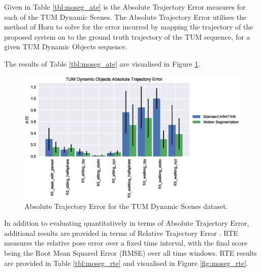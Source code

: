 Given in Table \ref{tbl:moseg_ate} is the Absolute Trajectory Error measures
for each of the TUM Dynamic Scenes. The Absolute Trajectory Error utilises the
method of Horn \cite{Horn1987} to solve for the error incurred by mapping the
trajectory of the proposed system on to the ground truth trajectory of the TUM
sequence, for a given TUM Dynamic Objects sequence.

The results of Table \ref{tbl:moseg_ate} are visualised in Figure
\ref{fig:moseg_ate}.

\begin{figure}[ht]
  \label{fig:moseg_ate}
  \centering
  \includegraphics[width=\linewidth]{figures/moseg/ate.eps}
  \caption[Motion Segmentation ATE]
  {Absolute Trajectory Error for the TUM Dynamic Scenes dataset.}
\end{figure}

In addition to evaluating quantitatively in terms of Absolute Trajectory Error,
additional results are provided in terms of Relative Trajectory Error
\cite{Sturm2012}. RTE measures the relative pose error over a fixed time
interval, with the final score being the Root Mean Squared Error (RMSE) over all 
time windows. RTE results are provided in Table \ref{tbl:moseg_rte} and visualised 
in Figure \ref{fig:moseg_rte}.

